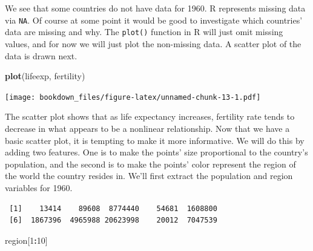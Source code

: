 \documentclass[
]{krantz}
\makeatletter
\newenvironment{Shaded}{\begin{snugshade}}{\end{snugshade}}
\newcommand{\DecValTok}[1]{\textcolor[rgb]{0.06,0.06,0.06}{#1}}
\newcommand{\KeywordTok}[1]{\textcolor[rgb]{0.27,0.27,0.27}{\textbf{#1}}}
\newcommand{\NormalTok}[1]{#1}
\newcommand{\OperatorTok}[1]{\textcolor[rgb]{0.43,0.43,0.43}{\textbf{#1}}}
\newcommand{\StringTok}[1]{\textcolor[rgb]{0.5,0.5,0.5}{#1}}
\newenvironment{kframe}{%
\medskip{}
\setlength{\fboxsep}{.8em}
 \def\at@end@of@kframe{}%
 \ifinner\ifhmode%
  \def\at@end@of@kframe{\end{minipage}}%
  \begin{minipage}{\columnwidth}%
 \fi\fi%
 \def\FrameCommand##1{\hskip\@totalleftmargin \hskip-\fboxsep
 \colorbox{shadecolor}{##1}\hskip-\fboxsep
     \hskip-\linewidth \hskip-\@totalleftmargin \hskip\columnwidth}%
 \MakeFramed {\advance\hsize-\width
   \@totalleftmargin\z@ \linewidth\hsize
   \@setminipage}}%
 {\par\unskip\endMakeFramed%
 \at@end@of@kframe}
\renewenvironment{Shaded}{\begin{kframe}}{\end{kframe}}
\makeatother
\begin{document}
We see that some countries do not have data for 1960. R represents missing data via \texttt{NA}. Of course at some point it would be good to investigate which countries' data are missing and why. The \texttt{plot()} function in R will just omit missing values, and for now we will just plot the non-missing data. A scatter plot of the data is drawn next.

\begin{Shaded}
\begin{Highlighting}[]
\KeywordTok{plot}\NormalTok{(lifeexp, fertility)}
\end{Highlighting}
\end{Shaded}

\texttt{[image: bookdown\_files/figure-latex/unnamed-chunk-13-1.pdf]}

The scatter plot shows that as life expectancy increases, fertility rate tends to decrease in what appears to be a nonlinear relationship. Now that we have a basic scatter plot, it is tempting to make it more informative. We will do this by adding two features. One is to make the points' size proportional to the country's population, and the second is to make the points' color represent the region of the world the country resides in. We'll first extract the population and region variables for 1960.

\begin{Shaded}
\end{Shaded}

\begin{verbatim}
 [1]    13414    89608  8774440    54681  1608800
 [6]  1867396  4965988 20623998    20012  7047539
\end{verbatim}

\begin{Shaded}
\begin{Highlighting}[]
\NormalTok{region[}\DecValTok{1}\OperatorTok{:}\DecValTok{10}\NormalTok{]}
\end{Highlighting}
\end{Shaded}
\end{document}
